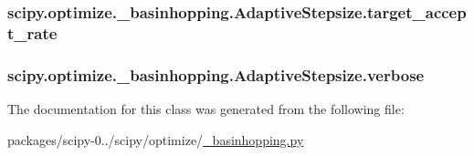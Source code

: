 \subsubsection[{target\+\_\+accept\+\_\+rate}]{\setlength{\rightskip}{0pt plus 5cm}scipy.\+optimize.\+\_\+basinhopping.\+Adaptive\+Stepsize.\+target\+\_\+accept\+\_\+rate}\label{classscipy_1_1optimize_1_1__basinhopping_1_1AdaptiveStepsize_a742a08f538bcb508524c9fd2ec9db748}
\hypertarget{classscipy_1_1optimize_1_1__basinhopping_1_1AdaptiveStepsize_a0fc1833897f80294d6b78e82177f286b}{}
\subsubsection[{verbose}]{\setlength{\rightskip}{0pt plus 5cm}scipy.\+optimize.\+\_\+basinhopping.\+Adaptive\+Stepsize.\+verbose}\label{classscipy_1_1optimize_1_1__basinhopping_1_1AdaptiveStepsize_a0fc1833897f80294d6b78e82177f286b}


The documentation for this class was generated from the following file\+:\begin{DoxyCompactItemize}
\item 
packages/scipy-\/0../scipy/optimize/\hyperlink{__basinhopping_8py}{\+\_\+basinhopping.\+py}\end{DoxyCompactItemize}

